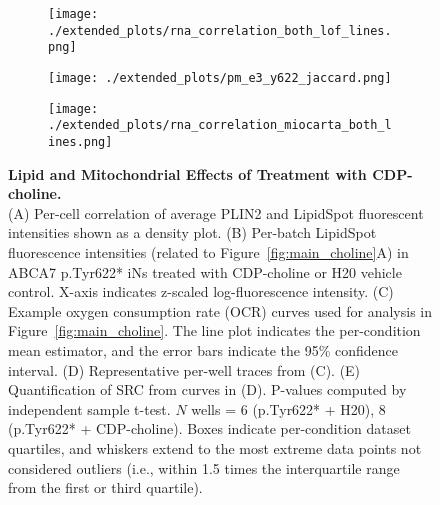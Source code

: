 \begin{figure}[ht]
    \begin{subfigure}[t]{.3\textwidth}
        \caption{}
        \texttt{[image: ./extended\_plots/rna\_correlation\_both\_lof\_lines.png]}        
    \end{subfigure}
    \begin{subfigure}[t]{.3\textwidth}
        \caption{}
        \texttt{[image: ./extended\_plots/pm\_e3\_y622\_jaccard.png]}        
    \end{subfigure}
    \begin{subfigure}[t]{.3\textwidth}
        \caption{}
        \texttt{[image: ./extended\_plots/rna\_correlation\_miocarta\_both\_lines.png]}        
    \end{subfigure}
    \caption{
         \textbf{Lipid and Mitochondrial Effects of Treatment with CDP-choline.}\\[1ex]
         (A) Per-cell correlation of average PLIN2 and LipidSpot fluorescent intensities shown as a density plot. 
         (B) Per-batch LipidSpot fluorescence intensities (related to Figure~\ref{fig:main_choline}A) in ABCA7 p.Tyr622* iNs treated with CDP-choline or H20 vehicle control. X-axis indicates z-scaled log-fluorescence intensity. 
         (C) Example oxygen consumption rate (OCR) curves used for analysis in Figure~\ref{fig:main_choline}. The line plot indicates the per-condition mean estimator, and the error bars indicate the 95\% confidence interval. 
         (D) Representative per-well traces from (C). 
         (E) Quantification of SRC from curves in (D). P-values computed by independent sample t-test. $N$ wells = 6 (p.Tyr622* + H20), 8 (p.Tyr622* + CDP-choline). Boxes indicate per-condition dataset quartiles, and whiskers extend to the most extreme data points not considered outliers (i.e., within 1.5 times the interquartile range from the first or third quartile). 
     }
     \label{fig:rnaseq_both_lof_lines}
 \end{figure}